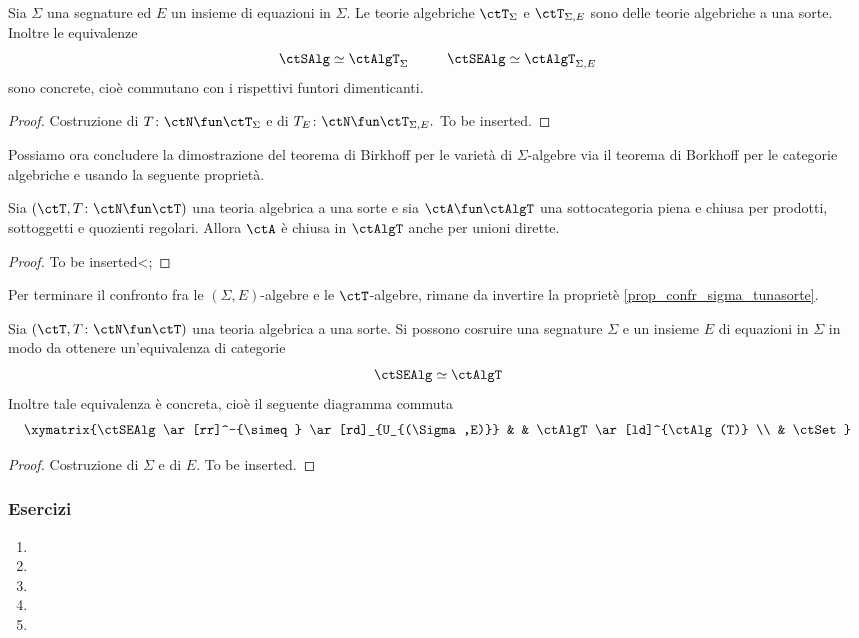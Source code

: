 \begin{proposition}\label{prop_confr_sigma_tunasorte}
Sia $\Sigma$ una segnature ed $E$ un insieme di equazioni in $\Sigma.$ Le teorie algebriche $\ctT_{\Sigma}$ e $\ctT_{\Sigma,E}$
sono delle teorie algebriche a una sorte. Inoltre le equivalenze
$$\ctSAlg \simeq \ctAlgT_{\Sigma} \;\;\;\;\;\;\;\;\;\; \ctSEAlg \simeq \ctAlgT_{\Sigma,E}$$
sono concrete, cioè commutano con i rispettivi funtori dimenticanti.
\end{proposition} 

\begin{proof}
Costruzione di $T \colon \ctN \fun \ctT_{\Sigma}$ e di $T_E \colon \ctN \fun \ctT_{\Sigma,E}.$ To be inserted.
\end{proof} 

Possiamo ora concludere la dimostrazione del teorema di Birkhoff per le varietà di $\Sigma$-algebre via il teorema di Borkhoff
per le categorie algebriche e usando la seguente proprietà.

\begin{proposition}\label{prop_rid_Birkhoff}
Sia $(\ctT, T \colon \ctN \fun \ctT)$ una teoria algebrica a una sorte e sia $\ctA \fun \ctAlgT$ una sottocategoria piena e chiusa
per prodotti, sottoggetti e quozienti regolari. Allora $\ctA$ è chiusa in $\ctAlgT$ anche per unioni dirette.
\end{proposition}

\begin{proof}
To be inserted<;
\end{proof} 

Per terminare il confronto fra le $(\Sigma,E)$-algebre e le $\ctT$-algebre, rimane da invertire la proprietè \ref{prop_confr_sigma_tunasorte}.

\begin{proposition}\label{prop_confr_sigma_tunasorte_bis}
Sia $(\ctT, T \colon \ctN \fun \ctT)$ una teoria algebrica a una sorte. Si possono cosruire una segnature $\Sigma$ e un insieme $E$ di equazioni 
in $\Sigma$ in modo da ottenere un'equivalenza di categorie
$$\ctSEAlg \simeq \ctAlgT$$
Inoltre tale equivalenza è concreta, cioè il seguente diagramma commuta
$$\xymatrix{\ctSEAlg \ar[rr]^-{\simeq} \ar[rd]_{U_{(\Sigma,E)}} & & \ctAlgT \ar[ld]^{\ctAlg(T)} \\
& \ctSet }$$
\end{proposition}

\begin{proof}
Costruzione di $\Sigma$ e di $E.$ To be inserted.
\end{proof} 


\subsubsection*{Esercizi}
\begin{enumerate}
	\item
	\item
	\item
	\item
	\item
\end{enumerate}
